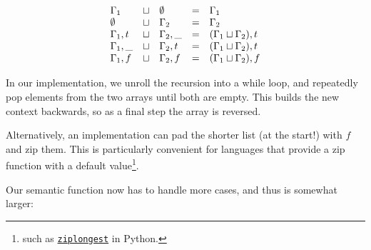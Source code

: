 \documentclass[conference]{IEEEtran}
\begin{document}
\begin{equation*}
    \begin{array}{l l l l l}
        \Gamma_1    & \sqcup & \emptyset   & = & \Gamma_1                     \\
        \emptyset   & \sqcup & \Gamma_2    & = & \Gamma_2                     \\
        \Gamma_1,t  & \sqcup & \Gamma_2,\_ & = & (\Gamma_1 \sqcup \Gamma_2),t \\
        \Gamma_1,\_ & \sqcup & \Gamma_2,t  & = & (\Gamma_1 \sqcup \Gamma_2),t \\
        \Gamma_1,f  & \sqcup & \Gamma_2,f  & = & (\Gamma_1 \sqcup \Gamma_2),f \\
    \end{array}
\end{equation*}

In our implementation, we unroll the recursion into a while loop, and repeatedly pop elements from the two arrays until both are empty.
This builds the new context backwards, so as a final step the array is reversed.

Alternatively, an implementation can pad the shorter list (at the start!) with $f$ and zip them.
This is particularly convenient for languages that provide a zip function with a default value\footnote{such as \href{https://docs.python.org/3/library/itertools.html\#itertools.zip\_longest}{\texttt{ziplongest}} in Python.}.

Our semantic function now has to handle more cases, and thus is somewhat larger:
\end{document}
